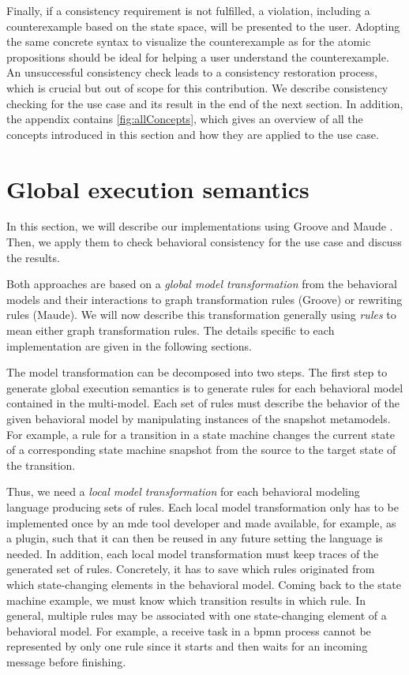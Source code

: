 \documentclass{jot}
\begin{document}
Finally, if a consistency requirement is not fulfilled, a violation, including a counterexample based on the state space, will be presented to the user.
Adopting the same concrete syntax to visualize the counterexample as for the atomic propositions should be ideal for helping a user understand the counterexample. 
An unsuccessful consistency check leads to a consistency restoration process, which is crucial but out of scope for this contribution.
We describe consistency checking for the use case and its result in the end of the next section.
In addition, the appendix contains \cref{fig:allConcepts}, which gives an overview of all the concepts introduced in this section and how they are applied to the use case.






\section{Global execution semantics} \label{sec:global_execution_semantics}

In this section, we will describe our implementations using Groove \cite{ghamarianModellingAnalysisUsing2012, rensinkGROOVESimulatorTool2004} and Maude \cite{manuelclavelAllMaudeHighPerformance2007}.
Then, we apply them to check behavioral consistency for the use case and discuss the results.

Both approaches are based on a \textit{global model transformation} from the behavioral models and their interactions to graph transformation rules (Groove) or rewriting rules (Maude).
We will now describe this transformation generally using \textit{rules} to mean either graph transformation rules.
The details specific to each implementation are given in the following sections.

The model transformation can be decomposed into two steps.
The first step to generate global execution semantics is to generate rules for each behavioral model contained in the multi-model.
Each set of rules must describe the behavior of the given behavioral model by manipulating instances of the snapshot metamodels.
For example, a rule for a transition in a state machine changes the current state of a corresponding state machine snapshot from the source to the target state of the transition. 

Thus, we need a \emph{local model transformation} for each behavioral modeling language producing sets of rules.
Each local model transformation only has to be implemented once by an \gls*{mde} tool developer and made available, for example, as a plugin, such that it can then be reused in any future setting the language is needed.
In addition, each local model transformation must keep traces of the generated set of rules.
Concretely, it has to save which rules originated from which state-changing elements in the behavioral model.
Coming back to the state machine example, we must know which transition results in which rule.
In general, multiple rules may be associated with one state-changing element of a behavioral model.
For example, a receive task in a \gls*{bpmn} process cannot be represented by only one rule since it starts and then waits for an incoming message before finishing.
\end{document}
